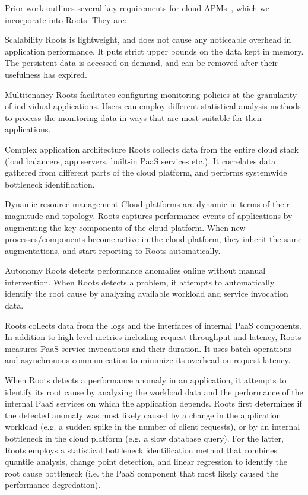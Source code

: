 Prior work outlines several key requirements for cloud APMs~\cite{DaCunhaRodrigues:2016:MCC:2851613.2851619,Ibidunmoye:2015:PAD:2808687.2791120},
which we incorporate into Roots.  They are:
\begin{LaTeXdescription}
\item[Scalability] Roots is lightweight, and does not cause any noticeable overhead in 
application performance. It puts strict upper bounds on the data kept in memory. 
The persistent data is accessed on demand, and can be removed after their usefulness has expired.
\item[Multitenancy] Roots facilitates configuring monitoring policies at the granularity of individual applications.
Users can employ different statistical analysis methods to process the monitoring data in ways that are 
most suitable for their applications.
\item[Complex application architecture] Roots collects data from the entire cloud stack 
(load balancers, app servers, built-in PaaS services etc.). It correlates data gathered
from different parts of the cloud platform, and performs systemwide bottleneck identification.
\item[Dynamic resource management] Cloud platforms are dynamic in terms of their magnitude 
and topology. Roots captures performance events of applications by augmenting 
the key components of the cloud platform. When new processes/components become active
in the cloud platform, they inherit the same augmentations, and start reporting to Roots automatically.
\item[Autonomy] Roots detects performance anomalies online without manual intervention.
When Roots detects a problem, it attempts to automatically identify the root cause by analyzing
available workload and service invocation data.
\vspace{-0.05in}
\end{LaTeXdescription}

Roots collects data from the logs and the interfaces of internal PaaS components.
In addition to high-level metrics including request throughput
and latency, 
Roots measures PaaS service invocations and their duration.
It uses batch operations and asynchronous 
communication to minimize its overhead on request latency.

When Roots detects a performance anomaly in an application, 
it attempts to identify its 
root cause by analyzing the workload data
and the performance of the internal PaaS services on which the 
application depends.
Roots first determines if the detected anomaly was most likely caused by a change in the
application workload (e.g. a sudden spike in the number of client requests), or by an internal
bottleneck in the cloud platform (e.g. a slow database query). 
For the latter,
Roots employs a statistical bottleneck identification method 
that  combines quantile analysis, change point detection,
and linear regression to identify the root cause bottleneck 
(i.e. the PaaS component that most likely caused the performance degredation).

